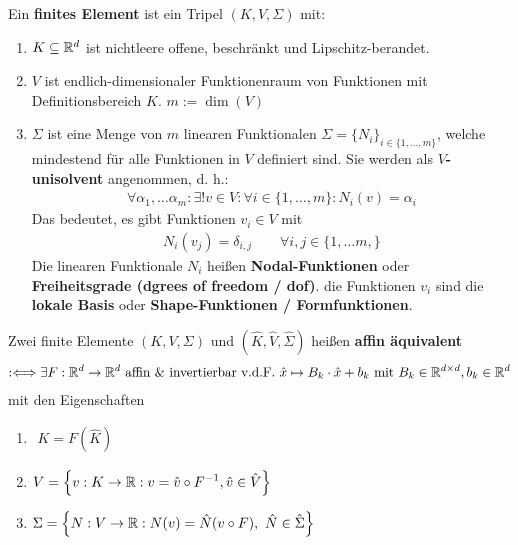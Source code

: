 \begin{definition}\enter %
Ein \textbf{finites Element} ist ein Tripel $(K,V,\Sigma)$ mit:
\begin{enumerate}[label=(\roman*)]
\item $K\subseteq\mathbb{R}^d$ ist nichtleere offene, beschränkt und Lipschitz-berandet.
\item $V$ ist endlich-dimensionaler Funktionenraum von Funktionen mit Definitionsbereich $K$. $m:=\dim(V)$
\item $\Sigma$ ist eine Menge von $m$ linearen Funktionalen $\Sigma=\lbrace N_i\rbrace_{i\in\lbrace1,\ldots,m\rbrace}$, welche mindestend für alle Funktionen in $V$ definiert sind. Sie werden als \textbf{$V$-unisolvent} angenommen, d. h.:
\begin{align*}
\forall \alpha_1,\ldots\alpha_m:\exists! v\in V:\forall i\in\lbrace1,\ldots,m\rbrace:N_i(v)=\alpha_i
\end{align*}
Das bedeutet, es gibt Funktionen $v_i\in V$ mit
\begin{align*}
N_i(v_j)=\delta_{i,j}\qquad\forall i,j\in\lbrace1,\ldots m,\rbrace
\end{align*}
Die linearen Funktionale $N_i$ heißen \textbf{Nodal-Funktionen} oder \textbf{Freiheitsgrade (dgrees of freedom / dof)}. die Funktionen $v_i$ sind die \textbf{lokale Basis} oder \textbf{Shape-Funktionen / Formfunktionen}.
\end{enumerate}
\end{definition}

\begin{definition}\enter %
Zwei finite Elemente $(K,V,\Sigma)$ und $(\hat{K},\hat{V},\hat{\Sigma})$ heißen \textbf{affin äquivalent}
\begin{align*}
:\Longleftrightarrow\exists F:\mathbb{R}^d\to\mathbb{R}^d\text{ affin \& invertierbar v.d.F. }
\hat{x}\mapsto B_k\cdot\hat{x}+b_k\text{ mit } B_k\in\mathbb{R}^{d\times d},b_k\in\mathbb{R}^d
\end{align*}
mit den Eigenschaften
\begin{enumerate}[label=(\arabic*)]
\item $\begin{aligned}
K=F(\hat{K})
\end{aligned}$
\item $\begin{aligned}
V=\Big\lbrace v: K\to\mathbb{R}:v=\hat{v}\circ F^{-1},\hat{v}\in\hat{V}\Big\rbrace
\end{aligned}$
\item $\begin{aligned}
\Sigma=\Big\lbrace N:V\to\mathbb{R}:N(v)=\hat{N}(v\circ F),~\hat{N}\in\hat{\Sigma}\Big\rbrace
\end{aligned}$
\end{enumerate}

\end{definition}

